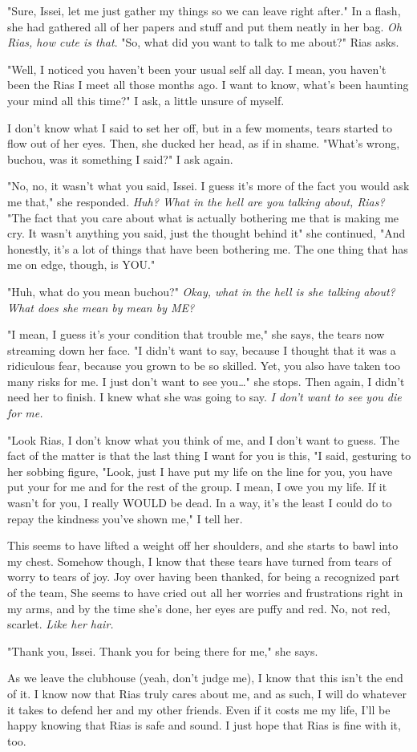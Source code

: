 \documentclass{article}
\begin{document}
"Sure, Issei, let me just gather my things so we can leave right after." In a flash, she had gathered all of her papers and stuff and put them neatly in her bag. \emph{Oh Rias, how cute is that}. "So, what did you want to talk to me about?" Rias asks.

"Well, I noticed you haven't been your usual self all day. I mean, you haven't been the Rias I meet all those months ago. I want to know, what's been haunting your mind all this time?" I ask, a little unsure of myself.

I don't know what I said to set her off, but in a few moments, tears started to flow out of her eyes. Then, she ducked her head, as if in shame. "What's wrong, buchou, was it something I said?" I ask again.

"No, no, it wasn't what you said, Issei. I guess it's more of the fact you would ask me that," she responded. \emph{Huh? What in the hell are you talking about, Rias?} "The fact that you care about what is actually bothering me that is making me cry. It wasn't anything you said, just the thought behind it" she continued, "And honestly, it's a lot of things that have been bothering me. The one thing that has me on edge, though, is YOU."

"Huh, what do you mean buchou?" \emph{Okay, what in the hell is she talking about? What does she mean by mean by ME?}

"I mean, I guess it's your condition that trouble me," she says, the tears now streaming down her face. "I didn't want to say, because I thought that it was a ridiculous fear, because you grown to be so skilled. Yet, you also have taken too many risks for me. I just don't want to see you…" she stops. Then again, I didn't need her to finish. I knew what she was going to say. \emph{I don't want to see you die for me.}

"Look Rias, I don't know what you think of me, and I don't want to guess. The fact of the matter is that the last thing I want for you is this, "I said, gesturing to her sobbing figure, "Look, just I have put my life on the line for you, you have put your for me and for the rest of the group. I mean, I owe you my life. If it wasn't for you, I really WOULD be dead. In a way, it's the least I could do to repay the kindness you've shown me," I tell her.

This seems to have lifted a weight off her shoulders, and she starts to bawl into my chest. Somehow though, I know that these tears have turned from tears of worry to tears of joy. Joy over having been thanked, for being a recognized part of the team, She seems to have cried out all her worries and frustrations right in my arms, and by the time she's done, her eyes are puffy and red. No, not red, scarlet. \emph{Like her hair.}

"Thank you, Issei. Thank you for being there for me," she says.

As we leave the clubhouse (yeah, don't judge me), I know that this isn't the end of it. I know now that Rias truly cares about me, and as such, I will do whatever it takes to defend her and my other friends. Even if it costs me my life, I'll be happy knowing that Rias is safe and sound. I just hope that Rias is fine with it, too.
\end{document}

